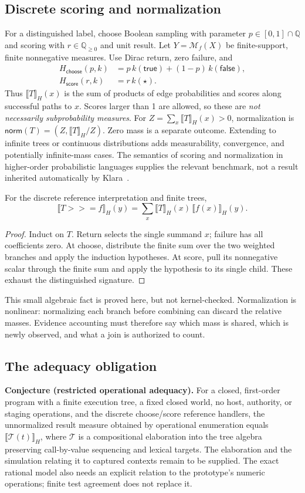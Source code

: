 \documentclass[acmsmall,screen,review,nonacm]{acmart}
\newcommand{\kw}[1]{\mathsf{#1}}
\newcommand{\bind}{\mathbin{>\!\!>\!=}}
\newcommand{\den}[1]{\llbracket #1\rrbracket}
\begin{document}
\subsection{Discrete scoring and normalization}
For a distinguished label, choose Boolean sampling with parameter
$p\in[0,1]\cap\mathbb Q$ and scoring with $r\in\mathbb Q_{\geq0}$ and unit
result. Let $Y=\mathcal M_f(X)$ be finite-support, finite nonnegative measures.
Use Dirac return, zero failure, and
\[
\begin{split}
 H_{\kw{choose}}(p,k)&=p\,k(\kw{true})+(1-p)\,k(\kw{false}),\\
 H_{\kw{score}}(r,k)&=r\,k(\star).
\end{split}
\]
Thus $\den T_H(x)$ is the sum of products of edge probabilities and scores
along successful paths to $x$. Scores larger than 1 are allowed, so these
are \emph{not necessarily subprobability measures}. For
$Z=\sum_x\den T_H(x)>0$, normalization is
$\kw{norm}(T)=(Z,\den T_H/Z)$. Zero mass is a separate outcome. Extending to
infinite trees or continuous distributions adds measurability, convergence,
and potentially infinite-mass cases. The semantics of scoring and
normalization in higher-order probabilistic languages supplies the relevant
benchmark, not a result inherited automatically by Klara~\cite{staton2016}.

\begin{proposition}
For the discrete reference interpretation and finite trees,
\[
 \den{T\bind f}_H(y)=\sum_x\den T_H(x)\,\den{f(x)}_H(y).
\]
\end{proposition}
\begin{proof}
Induct on $T$. Return selects the single summand $x$; failure has all
coefficients zero. At choose, distribute the finite sum over the two
weighted branches and apply the induction hypotheses. At score, pull its
nonnegative scalar through the finite sum and apply the hypothesis to its
single child. These exhaust the distinguished signature.
\end{proof}
This small algebraic fact is proved here, but not kernel-checked. Normalization
is nonlinear: normalizing each branch before combining can discard the
relative masses. Evidence accounting must therefore say which mass is shared,
which is newly observed, and what a join is authorized to count.

\subsection{The adequacy obligation}
\textbf{Conjecture (restricted operational adequacy).} For a closed, first-order
program with a finite execution tree, a fixed closed world, no host, authority,
or staging operations, and the discrete choose/score reference handlers,
the unnormalized result measure obtained by operational enumeration equals
$\den{\mathcal T(t)}_H$, where $\mathcal T$ is a compositional elaboration into
the tree algebra preserving call-by-value sequencing and lexical targets.
The elaboration and the simulation relating it to captured contexts remain to
be supplied. The exact rational model also needs an explicit relation to the
prototype's numeric operations; finite test agreement does not replace it.
\end{document}
